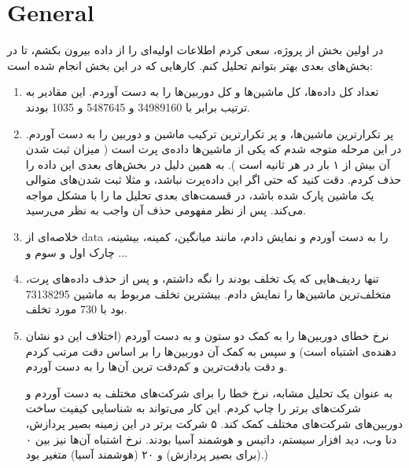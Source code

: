 \section{General}

در اولین بخش از پروژه، سعی کردم اطلاعات اولیه‌ای را از داده بیرون بکشم، تا در 
بخش‌های بعدی بهتر بتوانم تحلیل کنم. کارهایی که در این بخش انجام شده است:

\begin{enumerate}
    \item 
    تعداد کل داده‌ها، کل ماشین‌ها و کل دوربین‌ها را به دست آوردم. این مقادیر 
    به ترتیب برابر با 
    34989160
    و 
    5487645
    و 
    1035
    بودند.

    \item 
    پر تکرارترین ماشین‌ها، و پر تکرارترین ترکیب ماشین و دوربین را به دست آوردم. 
    در این مرحله متوجه شدم که یکی از ماشین‌ها داده‌ی پرت است (
        میزان ثبت شدن آن بیش از ۱ بار در هر ثانیه است
    ). به همین دلیل 
    در بخش‌های بعدی این داده را حذف کردم. دقت کنید که حتی اگر این داده‌پرت نباشد، 
    و مثلا ثبت شدن‌های متوالی یک ماشین پارک شده باشد، در قسمت‌های بعدی 
    تحلیل ما را با مشکل مواجه می‌کند. پس از نظر مفهومی حذف آن واجب به نظر می‌رسید.

    \item 
    خلاصه‌ای از 
    data
    را به دست آوردم و نمایش دادم، مانند میانگین، کمینه، بیشینه، چارک اول و سوم و ...

    \item 
    تنها ردیف‌هایی که یک تخلف بودند را نگه داشتم، و پس از حذف داده‌های پرت، متخلف‌ترین 
    ماشین‌ها را نمایش دادم. 
    بیشترین تخلف مربوط به ماشین
    73138295
    بود با 
    730
    مورد تخلف.

    \item 
    نرخ خطای دوربین‌ها را به کمک دو ستون
    و
    به دست آوردم (اختلاف این دو نشان‌ دهنده‌ی اشتباه است) و سپس به کمک آن دوربین‌ها را بر اساس دقت 
    مرتب کردم و دقت با‌دقت‌ترین و کم‌دقت ترین‌ آن‌ها را به دست آوردم. 

    به عنوان یک تحلیل مشابه، نرخ خطا را برای شرکت‌های مختلف به دست آوردم و شرکت‌های برتر را چاپ کردم. این کار می‌تواند به شناسایی 
    کیفیت ساخت دوربین‌های شرکت‌های مختلف کمک کند. ۵ شرکت برتر در این زمینه بصیر پردازش، دنا وب، دید افزار سیستم، داتیس و هوشمند آسیا بودند.
    نرخ اشتباه آن‌ها نیز بین ۰ (برای بصیر پردازش) و ۲۰ (هوشمند آسیا) متغیر بود.)
\end{enumerate}